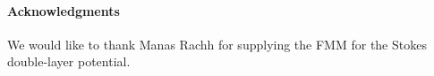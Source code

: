\documentclass[preprint, 10pt]{elsarticle}
\begin{document}
\paragraph{\bf Acknowledgments} We would like to thank Manas Rachh for supplying the FMM for the Stokes double-layer potential. 

 

\end{document}
